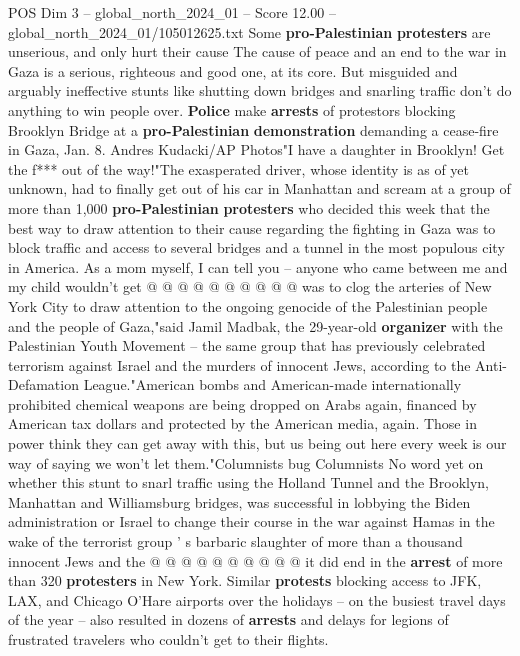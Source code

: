 \begin{textsample}{POS Dim 3 – global\_north\_2024\_01 – Score 12.00 – global\_north\_2024\_01/105012625.txt}  \label{ex:f3_pos_247}
Some \textbf{pro-Palestinian} \textbf{protesters} are unserious, and only hurt their cause The cause of peace and an end to the war in Gaza is a serious, righteous and good one, at its core.
But misguided and arguably ineffective stunts like shutting down bridges and snarling traffic don't do anything to win people over. \textbf{Police} make \textbf{arrests} of protestors blocking Brooklyn Bridge at a \textbf{pro-Palestinian} \textbf{demonstration} demanding a cease-fire in Gaza, Jan. 8.
Andres Kudacki/AP Photos"I have a daughter in Brooklyn!
Get the f*** out of the way!"The exasperated driver, whose identity is as of yet unknown, had to finally get out of his car in Manhattan and scream at a group of more than 1,000 \textbf{pro-Palestinian} \textbf{protesters} who decided this week that the best way to draw attention to their cause regarding the fighting in Gaza was to block traffic and access to several bridges and a tunnel in the most populous city in America.
As a mom myself, I can tell you -- anyone who came between me and my child wouldn't get @ @ @ @ @ @ @ @ @ @ was to clog the arteries of New York City to draw attention to the ongoing genocide of the Palestinian people and the people of Gaza,"said Jamil Madbak, the 29-year-old \textbf{organizer} with the Palestinian Youth Movement -- the same group that has previously celebrated terrorism against Israel and the murders of innocent Jews, according to the Anti-Defamation League."American bombs and American-made internationally prohibited chemical weapons are being dropped on Arabs again, financed by American tax dollars and protected by the American media, again.
Those in power think they can get away with this, but us being out here every week is our way of saying we won't let them."Columnists bug Columnists No word yet on whether this stunt to snarl traffic using the Holland Tunnel and the Brooklyn, Manhattan and Williamsburg bridges, was successful in lobbying the Biden administration or Israel to change their course in the war against Hamas in the wake of the terrorist group ' s barbaric slaughter of more than a thousand innocent Jews and the @ @ @ @ @ @ @ @ @ @ it did end in the \textbf{arrest} of more than 320 \textbf{protesters} in New York.
Similar \textbf{protests} blocking access to JFK, LAX, and Chicago O'Hare airports over the holidays -- on the busiest travel days of the year -- also resulted in dozens of \textbf{arrests} and delays for legions of frustrated travelers who couldn't get to their flights.

\end{textsample}
